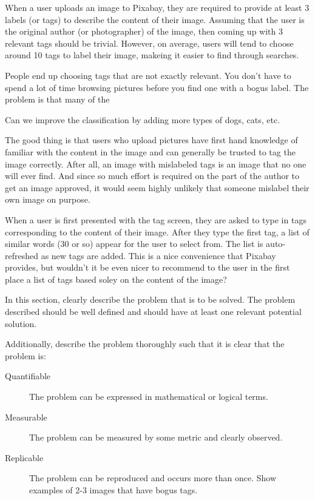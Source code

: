 \documentclass[10pt, a4paper, twocolumn]{article} %
\begin{document}
When a user uploads an image to Pixabay, they are required to provide at least 3 labels (or tags) to describe the content of their image.  Assuming that the user is the original author (or photographer) of the image, then coming up with 3 relevant tags should be trivial.  However, on average, users will tend to choose around 10 tags to label their image, makeing it easier to find through searches.  

People end up choosing tags that are not exactly relevant.
You don't have to spend a lot of time browsing pictures before you find one with a bogus label.
The problem is that many of the 


Can we improve the classification by adding more types of dogs, cats, etc.

The good thing is that users who upload pictures have first hand knowledge of familiar with the content in the image and can generally be trusted to tag the image correctly.  After all, an image with mislabeled tags is an image that no one will ever find. And since so much effort is required on the part of the author to get an image approved, it would seem highly unlikely that someone mislabel their own image on purpose.  

When a user is first presented with the tag screen, they are asked to type in tags corresponding to the content of their image.  After they type the first tag, a list of similar words (30 or so) appear for the user to select from. The list is auto-refreshed as new tags are added.  This is a nice convenience that Pixabay provides, but wouldn't it be even nicer to recommend to the user in the first place a list of tags based soley on the content of the image?  

In this section, clearly describe the problem that is to be solved. The problem described should be well defined and should have at least one relevant potential solution. 

Additionally, describe the problem thoroughly such that it is clear that the problem is:

\begin{description}
	\item[Quantifiable] The problem can be expressed in mathematical or logical terms.
	\item[Measurable] The problem can be measured by some metric and clearly observed.
	\item[Replicable] The problem can be reproduced and occurs more than once. Show examples of 2-3 images that have bogus tags.
\end{description}
\end{document}
